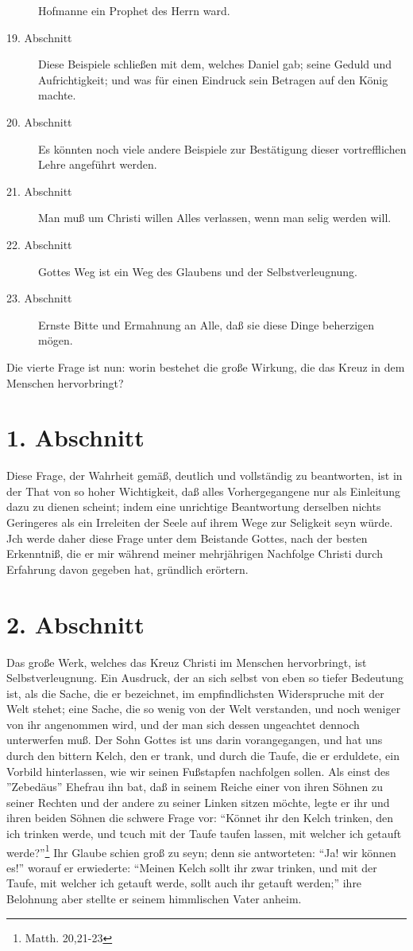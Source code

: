 \begin{description}
Hofmanne ein Prophet des Herrn ward.
\item[19. Abschnitt] Diese Beispiele schließen mit dem, welches Daniel gab;
seine Geduld und Aufrichtigkeit; und was für einen Eindruck sein Betragen auf
den König machte.
\item[20. Abschnitt] Es könnten noch viele andere Beispiele zur Bestätigung
dieser vortrefflichen Lehre angeführt werden.
\item[21. Abschnitt] Man muß um Christi willen Alles verlassen, wenn man selig
werden will.
\item[22. Abschnitt] Gottes Weg ist ein Weg des Glaubens und der
Selbstverleugnung.
\item[23. Abschnitt] Ernste Bitte und Ermahnung an Alle, daß sie diese Dinge
beherzigen mögen.
\end{description}
\normalsize


Die vierte Frage ist nun: worin bestehet die große Wirkung, die das Kreuz in dem
Menschen hervorbringt?

\section{1. Abschnitt}

Diese Frage, der Wahrheit gemäß, deutlich und vollständig zu beantworten, ist in
der That von so hoher Wichtigkeit, daß alles Vorhergegangene nur als Einleitung
dazu zu dienen scheint; indem eine unrichtige Beantwortung derselben nichts
Geringeres als ein Irreleiten der Seele auf ihrem Wege zur Seligkeit seyn würde.
Jch werde daher diese Frage unter dem Beistande Gottes, nach der besten
Erkenntniß, die er mir während meiner mehrjährigen Nachfolge Christi durch
Erfahrung davon gegeben hat, gründlich erörtern.

\section{2. Abschnitt}

Das große Werk, welches das Kreuz Christi im Menschen hervorbringt, ist
Selbstverleugnung. Ein Ausdruck, der an sich selbst von eben so tiefer Bedeutung
ist, als die Sache, die er bezeichnet, im empfindlichsten Widerspruche mit der
Welt stehet; eine Sache, die so wenig von der Welt verstanden, und noch weniger
von ihr angenommen wird, und der man sich dessen ungeachtet dennoch unterwerfen
muß. Der Sohn Gottes ist uns darin vorangegangen, und hat uns durch den bittern
Kelch, den er trank, und durch die Taufe, die er erduldete, ein Vorbild
hinterlassen, wie wir seinen Fußstapfen nachfolgen sollen. Als einst des
''Zebedäus'' Ehefrau ihn bat, daß in seinem Reiche einer von ihren Söhnen zu
seiner Rechten und der andere zu seiner Linken sitzen möchte, legte er ihr und
ihren beiden Söhnen die schwere Frage vor: "`Könnet ihr den Kelch trinken, den
ich trinken werde, und tcuch mit der Taufe taufen lassen, mit welcher ich
getauft werde?"'\footnote{Matth. 20,21-23} Ihr Glaube schien groß zu seyn; denn
sie antworteten: "`Ja! wir können es!"' worauf er erwiederte: "`Meinen Kelch
sollt ihr zwar trinken, und mit der Taufe, mit welcher ich getauft werde, sollt
auch ihr getauft werden;"' ihre Belohnung aber stellte er seinem himmlischen
Vater anheim.

